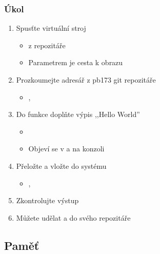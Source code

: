 \begin{frame}
  \frametitle{Úkol}

  \begin{enumerate}
    \item Spusťte virtuální stroj
    \begin{itemize}
      \item {} z repozitáře
      \item Parametrem je cesta k obrazu
    \end{itemize}

    \item Prozkoumejte adresář  z pb173 git repozitáře
    \begin{itemize}
      \item {}, 
    \end{itemize}

    \item Do  funkce doplňte výpis ,,Hello World''
    \begin{itemize}
      \item {}
      \item Objeví se v  a na konzoli
    \end{itemize}

    \item Přeložte a vložte do systému
    \begin{itemize}
      \item {}, 
    \end{itemize}

    \item Zkontrolujte výstup 
    \item Můžete udělat  \iffimuni a  \fi do svého
      repozitáře
  \end{enumerate}
\end{frame}

\iffimuni
\subsection{Paměť}
\fi

